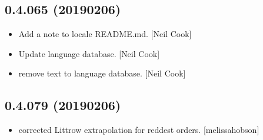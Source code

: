 \documentclass[a4paper,10pt,english]{report}
\begin{document}
\subsection{0.4.065 (2019\sphinxhyphen{}02\sphinxhyphen{}06)}
\label{\detokenize{misc/changelog:id211}}\begin{itemize}
\item {} 
Add a note to locale README.md. {[}Neil Cook{]}

\item {} 
Update language database. {[}Neil Cook{]}

\item {} 
 \sphinxhyphen{} remove text to language database. {[}Neil Cook{]}

\end{itemize}


\subsection{0.4.079 (2019\sphinxhyphen{}02\sphinxhyphen{}06)}
\label{\detokenize{misc/changelog:id212}}\begin{itemize}
\item {} 
 corrected Littrow extrapolation for reddest orders.
{[}melissa\sphinxhyphen{}hobson{]}

\end{itemize}
\end{document}
